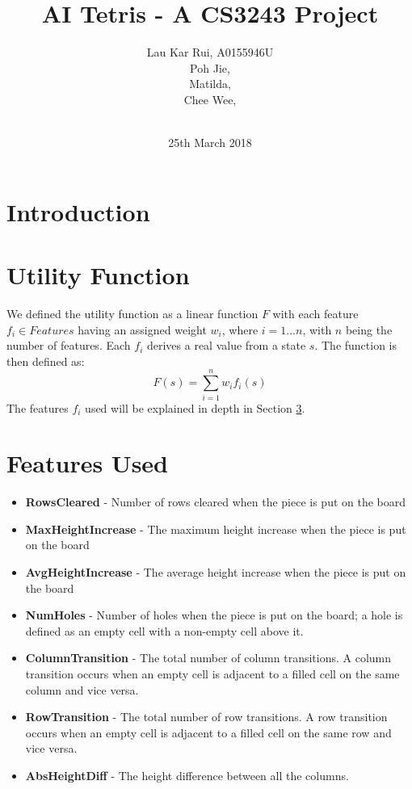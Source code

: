 \documentclass[12pt]{article}
\title{AI Tetris - A CS3243 Project}
\author
{Lau Kar Rui, A0155946U\\
Poh Jie, \\
Matilda, \\
Chee Wee, \\
\\
}
\date{25th March 2018}
\begin{document}
 


\baselineskip20pt


\maketitle 


\section{Introduction}
	
	
\section{Utility Function}
We defined the utility function as a linear function $F$ with each feature $f_i \in Features$ having an assigned weight $w_i$, where $i = 1...n$, with $n$ being the number of features. Each $f_i$ derives a real value from a state $s$. The function is then defined as:
	$$F(s) = \sum_{i = 1}^{n} w_if_i(s)$$
The features $f_i$ used will be explained in depth in Section \ref{features}.
	
\section{Features Used} \label{features}
\begin{itemize}
  \item \textbf{RowsCleared}
  		- Number of rows cleared when the piece is put on the board
  \item \textbf{MaxHeightIncrease} 
  		- The maximum height increase when the piece is put on the board
  \item \textbf{AvgHeightIncrease} 
  		- The average height increase when the piece is put on the board
  \item \textbf{NumHoles} 
  		- Number of holes when the piece is put on the board; a hole is defined as an empty cell with a non-empty cell above it.
  \item \textbf{ColumnTransition}
  		- The total number of column transitions. A column transition occurs when an empty cell is adjacent to a filled cell on the same column and vice versa.
  \item \textbf{RowTransition}
  		- The total number of row transitions. A row transition occurs when an empty cell is adjacent to a filled cell on the same row and vice versa.
  \item \textbf{AbsHeightDiff}
  		- The height difference between all the columns.
\end{itemize}
\end{document}
